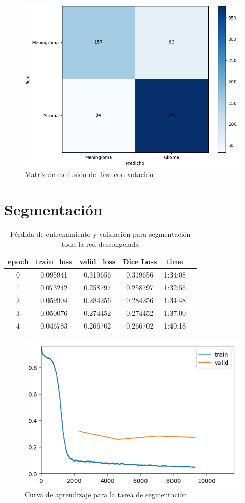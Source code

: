 \begin{figure}[H]
	\centering
	\includegraphics[width=0.8\linewidth]{imagenes/task1_test.png}
	\caption{Matriz de confusión de Test con votación}
\end{figure}


\section{Segmentación}

\begin{table}[H]
	\centering
	\begin{tabular}{|c|c|c|c|c|c|}
		\hline
		epoch & train\_loss & valid\_loss & Dice Loss & time \\ \hline
		0 & 0.095941 & 0.319656 & 0.319656 & 1:34:08 \\ \hline
		1 & 0.073242 & 0.258797 & 0.258797 & 1:32:56 \\ \hline
		2 & 0.059904 & 0.284256 & 0.284256 & 1:34:48 \\ \hline
		3 & 0.050076 & 0.274452 & 0.274452 & 1:37:00 \\ \hline
		4 & 0.046783 & 0.266702 & 0.266702 & 1:40:18 \\ \hline
	\end{tabular}
	\caption{Pérdida de entrenamiento y validación para segmentación toda la red descongelada}
	\label{tabla:resultados4}
\end{table}

\begin{figure}[H]
	\centering
	\includegraphics[width=0.8\linewidth]{imagenes/curva_segmentation.png}
	\caption{Curva de aprendizaje para la tarea de segmentación}
\end{figure}

